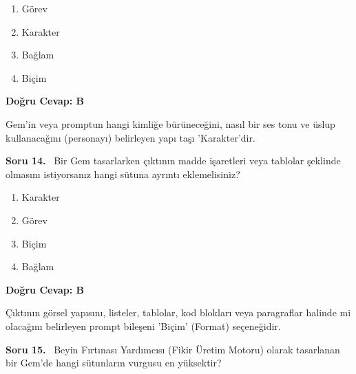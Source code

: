 \documentclass[11pt,a4paper,openany]{book}
\begin{document}
\begin{enumerate}[label=\Alph*), leftmargin=25pt, topsep=4pt, itemsep=2pt]
        \item Görev
        \item Karakter
        \item Bağlam
        \item Biçim
\end{enumerate}

\vspace{4pt}
\begin{tcolorbox}[title=Cevap ve Açıklama, colback=gray!3!white, colframe=primarycolor!90!black, arc=2mm, fonttitle=\bfseries\sffamily, top=6pt, bottom=6pt]
    \textbf{Doğru Cevap: B}

    \vspace{2pt}
    Gem'in veya promptun hangi kimliğe bürüneceğini, nasıl bir ses tonu ve üslup kullanacağını (personayı) belirleyen yapı taşı 'Karakter'dir.
\end{tcolorbox}
\vspace{10pt}
\needspace{5cm}
\vspace{8pt}
\noindent\textbf{\large\sffamily Soru 14.} \ Bir Gem tasarlarken çıktının madde işaretleri veya tablolar şeklinde olmasını istiyorsanız hangi sütuna ayrıntı eklemelisiniz?

\begin{enumerate}[label=\Alph*), leftmargin=25pt, topsep=4pt, itemsep=2pt]
        \item Karakter
        \item Görev
        \item Biçim
        \item Bağlam
\end{enumerate}

\vspace{4pt}
\begin{tcolorbox}[title=Cevap ve Açıklama, colback=gray!3!white, colframe=primarycolor!90!black, arc=2mm, fonttitle=\bfseries\sffamily, top=6pt, bottom=6pt]
    \textbf{Doğru Cevap: B}

    \vspace{2pt}
    Çıktının görsel yapısını, listeler, tablolar, kod blokları veya paragraflar halinde mi olacağını belirleyen prompt bileşeni 'Biçim' (Format) seçeneğidir.
\end{tcolorbox}
\vspace{10pt}
\needspace{5cm}
\vspace{8pt}
\noindent\textbf{\large\sffamily Soru 15.} \ Beyin Fırtınası Yardımcısı (Fikir Üretim Motoru) olarak tasarlanan bir Gem'de hangi sütunların vurgusu en yüksektir?
\end{document}

